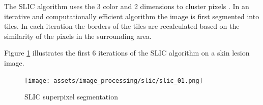 The SLIC algorithm uses the 3 color and 2 dimensions to cluster pixels \cite{slic}. In an iterative and computationally efficient algorithm the image is first segmented into tiles. In each iteration the borders of the tiles are recalculated based on the similarity of the pixels in the surrounding area.

Figure \ref{fig:slic} illustrates the first 6 iterations of the SLIC algorithm on a skin lesion image.


\begin{figure}[H]
    \texttt{[image: assets/image\_processing/slic/slic\_01.png]}
    \caption{SLIC superpixel segmentation}
    \label{fig:slic}
\end{figure}




